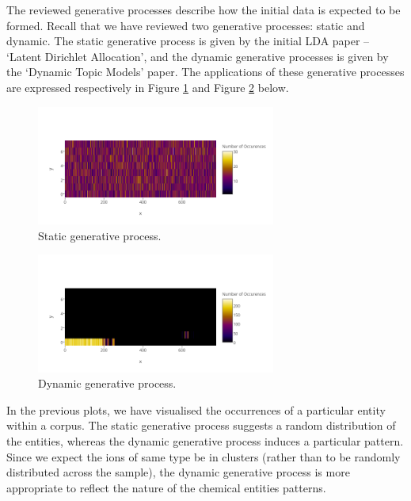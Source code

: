 \documentclass{mprop}
\begin{document}
\par The reviewed generative processes describe how the initial data is expected to be formed. Recall that we have reviewed two generative processes: static and dynamic. The static generative process is given by the initial LDA paper -- `Latent Dirichlet Allocation', and the dynamic generative processes is given by the `Dynamic Topic Models' paper. The applications of these generative processes are expressed respectively in Figure \ref{fig:static} and Figure \ref{fig:dynamic} below. 
\begin{figure}[H]
  \centering
  \includegraphics[width=0.7\textwidth]{static}
  \caption{Static generative process.}
  \label{fig:static}
\end{figure}
\begin{figure}[H]
  \centering
  \includegraphics[width=0.7\textwidth]{dynamic}
  \caption{Dynamic generative process.}
  \label{fig:dynamic}
\end{figure}
In the previous plots, we have visualised the occurrences of a particular entity within a corpus. The static generative process suggests a random distribution of the entities, whereas the dynamic generative process induces a particular pattern. Since we expect the ions of same type be in clusters (rather than to be randomly distributed across the sample), the dynamic generative process is more appropriate to reflect the nature of the chemical entities patterns.  

\end{document}
